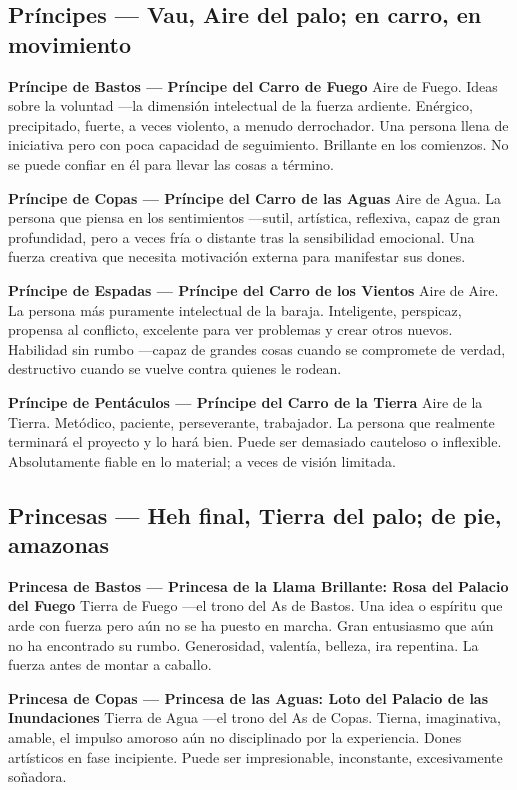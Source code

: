 \subsection{Príncipes --- Vau, Aire del palo; en carro, en movimiento}\label{princes--vau-air-of-the-suit-in-chariot-in-motion}

\textbf{Príncipe de Bastos --- Príncipe del Carro de Fuego} Aire de Fuego. Ideas sobre la voluntad ---la dimensión intelectual de la fuerza ardiente. Enérgico, precipitado, fuerte, a veces violento, a menudo derrochador. Una persona llena de iniciativa pero con poca capacidad de seguimiento. Brillante en los comienzos. No se puede confiar en él para llevar las cosas a término.

\textbf{Príncipe de Copas --- Príncipe del Carro de las Aguas} Aire de Agua. La persona que piensa en los sentimientos ---sutil, artística, reflexiva, capaz de gran profundidad, pero a veces fría o distante tras la sensibilidad emocional. Una fuerza creativa que necesita motivación externa para manifestar sus dones.

\textbf{Príncipe de Espadas --- Príncipe del Carro de los Vientos} Aire de Aire. La persona más puramente intelectual de la baraja. Inteligente, perspicaz, propensa al conflicto, excelente para ver problemas y crear otros nuevos. Habilidad sin rumbo ---capaz de grandes cosas cuando se compromete de verdad, destructivo cuando se vuelve contra quienes le rodean.

\textbf{Príncipe de Pentáculos --- Príncipe del Carro de la Tierra} Aire de la Tierra. Metódico, paciente, perseverante, trabajador. La persona que realmente terminará el proyecto y lo hará bien. Puede ser demasiado cauteloso o inflexible. Absolutamente fiable en lo material; a veces de visión limitada.

\subsection{Princesas --- Heh final, Tierra del palo; de pie, amazonas}\label{princesses--heh-final-earth-of-the-suit-standing-amazon}

\textbf{Princesa de Bastos --- Princesa de la Llama Brillante: Rosa del Palacio del Fuego} Tierra de Fuego ---el trono del As de Bastos. Una idea o espíritu que arde con fuerza pero aún no se ha puesto en marcha. Gran entusiasmo que aún no ha encontrado su rumbo. Generosidad, valentía, belleza, ira repentina. La fuerza antes de montar a caballo.

\textbf{Princesa de Copas --- Princesa de las Aguas: Loto del Palacio de las Inundaciones} Tierra de Agua ---el trono del As de Copas. Tierna, imaginativa, amable, el impulso amoroso aún no disciplinado por la experiencia. Dones artísticos en fase incipiente. Puede ser impresionable, inconstante, excesivamente soñadora.

